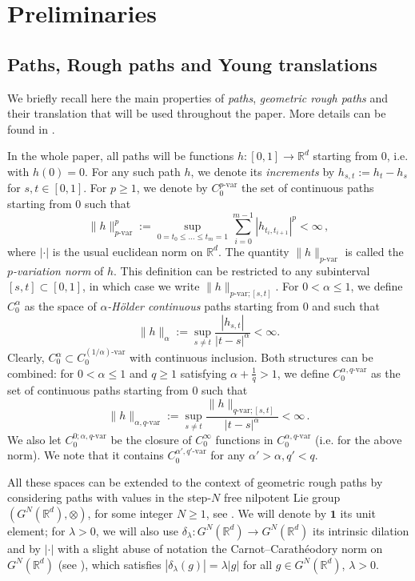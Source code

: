 \documentclass[12pt,a4paper]{article}
\numberwithin{equation}{section}
\newcommand\paul[1]{\textcolor{red}{{(paul) #1}}}
\def\bR{\mathbb{R}}\def\bS{\mathbb{S}}
\theoremstyle{plain}
\theoremstyle{definition}
\theoremstyle{remark}
\begin{document}
\section{Preliminaries}\label{sec:2}
\subsection{Paths, Rough paths and Young translations}
We briefly recall here the main properties of \emph{paths}, \emph{geometric rough paths} and their translation that will be used throughout the paper. More details can be found in \cite{frizbook}.

In the whole paper, all paths will be functions $h \colon [0,1] \to \bR^d$ starting from $0$, i.e. with $h(0)=0$. For any such path $h$, we denote its \emph{increments} by $h_{s,t} := h_t - h_s$ for $s,t \in [0,1]$. For $p \geq 1$, we denote by $C^{p\text{-var}}_0$ the set of continuous paths starting from $0$ such that
\[
\| h \|_{p\text{-var}}^p := \sup_{0 = t_0 \leq \ldots \leq t_m = 1}
    \sum_{i=0}^{m-1} |h_{t_i,t_{i+1}}|^p < \infty\,,
\]
where $|\cdot|$ is the usual euclidean norm on $\mathbb{R}^d$. The quantity $\| h \|_{p\text{-var}}$ is called the \emph{$p$-variation norm} of $h$. This definition can be restricted to any subinterval $[s,t] \subset [0,1]$, in which case we write $\| h \|_{p\text{-var};[s,t]}$. For $0 < \alpha \leq 1$, we define $C^{\alpha}_0$ as the space of \emph{$\alpha$-H\"older continuous} paths starting from $0$ and such that
\[
\| h \|_{\alpha} := \sup_{s \neq t} \frac{|h_{s,t}|}{|t-s|^{\alpha}} < \infty.
\]
Clearly, $C^{\alpha}_0 \subset C^{(1/\alpha)\text{-var}}_0$ with continuous inclusion. Both structures can be combined: for $0 < \alpha \leq 1$ and $q \geq 1$ satisfying $\alpha + \frac{1}{q} > 1$, we define $C^{\alpha, q\text{-var}}_0$ as the set of continuous paths starting from $0$ such that
\[
\| h \|_{\alpha,q\text{-var}} :=
    \sup_{s \neq t} \frac{\| h \|_{q\text{-var};[s,t]}}{|t-s|^{\alpha}} < \infty\,.
\]
We also let $C^{0;\alpha,q\text{-var}}_0$ be the closure of $C^{\infty}_0$ functions in $C^{\alpha, q\text{-var}}_0$ (i.e. for the above norm). We note that it contains $C^{\alpha', q'\text{-var}}_0$ for any $\alpha'>\alpha, q'<q$. %

All these spaces can be extended to the context of geometric rough paths by considering paths with values in the step-\(N\) free nilpotent Lie group \((G^N(\mathbb{R}^d), \otimes)\), for some integer \(N \geq 1\), see \cite[Theorem 7.30]{frizbook}. We will denote by \(\mathbf{1}\) its unit element; for \(\lambda > 0\), we will also use \(\delta_\lambda \colon G^N(\mathbb{R}^d) \to G^N(\mathbb{R}^d)\) its intrinsic dilation and by \(|\cdot|\) with a slight abuse of notation  the Carnot--Carath\'eodory norm on \(G^N(\mathbb{R}^d)\) (see \cite[Theorem 7.32]{frizbook}), which satisfies $|\delta_\lambda(g)| = \lambda |g| $ for all $g \in G^N(\mathbb{R}^d)$, $\lambda > 0$.
\end{document}
